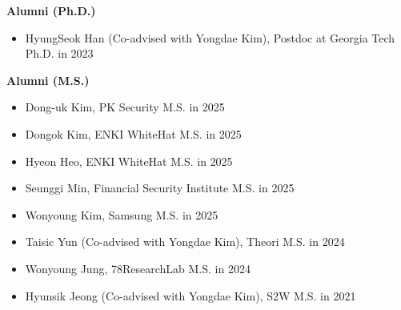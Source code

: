 \documentclass[11pt,letterpaper]{article}
\begin{document}
  \textbf{Alumni (Ph.D.)}
  \begin{itemize}[label=--,leftmargin=1.5em]
    \small
      \item HyungSeok Han (Co-advised with Yongdae Kim), Postdoc at Georgia Tech \hfill Ph.D. in 2023
  \end{itemize}

  \textbf{Alumni (M.S.)}
  \begin{itemize}[label=--,leftmargin=1.5em]
    \small
      \item Dong-uk Kim, PK Security \hfill M.S. in 2025
      \item Dongok Kim, ENKI WhiteHat \hfill M.S. in 2025
      \item Hyeon Heo, ENKI WhiteHat \hfill M.S. in 2025
      \item Seunggi Min, Financial Security Institute \hfill M.S. in 2025
      \item Wonyoung Kim, Samsung \hfill M.S. in 2025
      \item Taisic Yun (Co-advised with Yongdae Kim), Theori \hfill M.S. in 2024
      \item Wonyoung Jung, 78ResearchLab \hfill M.S. in 2024
      \item Hyunsik Jeong (Co-advised with Yongdae Kim), S2W \hfill M.S. in 2021
  \end{itemize}
\end{document}

